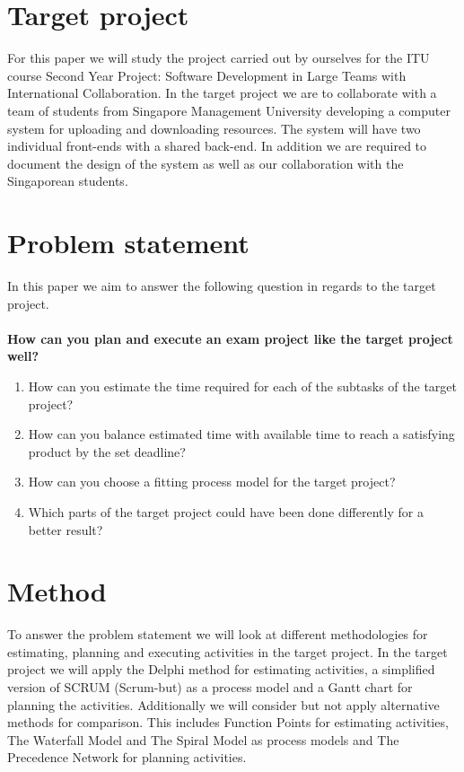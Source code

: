 \documentclass[../report.tex]{subfiles}
\begin{document}
\graphicspath{{img/}{../img/}}

\section*{Target project}
For this paper we will study the project carried out by ourselves for the ITU course 
Second Year Project: Software Development in Large Teams with International Collaboration.
In the target project we are to collaborate with a team of students from Singapore Management University
developing a computer system for uploading and downloading resources. The system will have two
individual front-ends with a shared back-end. In addition we are required to document the design
of the system as well as our collaboration with the Singaporean students.

\section*{Problem statement}
In this paper we aim to answer the following question in regards to the target project.
\\ \\	
\textbf{How can you plan and execute an exam project like the target project well?}
\begin{enumerate}
	\item	How can you estimate the time required for each of the subtasks of the target project?
	\item 	How can you balance estimated time with available time to reach a satisfying product by the set deadline?
	\item 	How can you choose a fitting process model for the target project?
	\item 	Which parts of the target project could have been done differently for a better result?
\end{enumerate}

\section*{Method}

To answer the problem statement we will look at different methodologies for estimating, planning and executing activities in the target project. In the target project we will apply the Delphi method for estimating activities, a simplified version of SCRUM (Scrum-but) as a process model and a Gantt chart for planning the activities. Additionally we will consider but not apply alternative methods for comparison. This includes Function Points for estimating activities, The Waterfall Model and The Spiral Model as process models and The Precedence Network for planning activities. 
\end{document}
